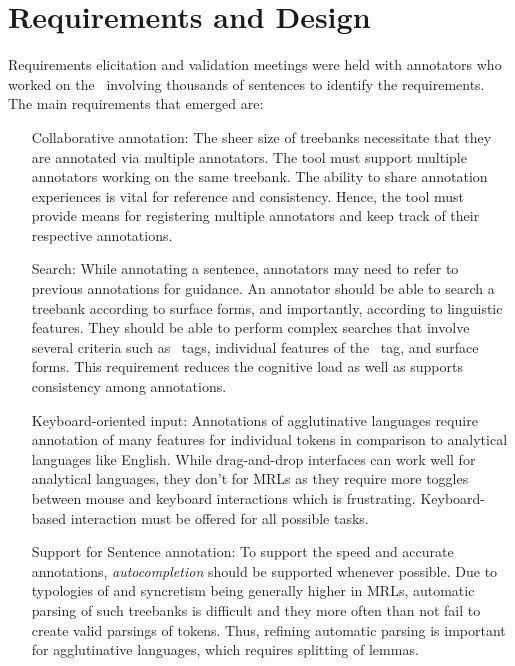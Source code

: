 \section{Requirements and Design}
\label{sec:requirements}


Requirements elicitation and validation meetings were held with annotators who worked on the  \bountreebank\ involving thousands of sentences to identify the requirements.
The main requirements that emerged are:
\begin{itemize}[before=\normalfont, font=\itshape, align=left,noitemsep,topsep=0pt,parsep=0pt,partopsep=0pt,labelwidth=5cm,align=left,itemindent=5cm]
    \item[Collaborative annotation:]
        The sheer size of treebanks necessitate that they are annotated via multiple annotators.
        The tool must support multiple annotators working on the same treebank.
        The ability to share annotation experiences is vital for reference and consistency.
        Hence, the tool must provide means for registering multiple annotators and keep track of their respective annotations.
    \item[Search:]
        While annotating a sentence, annotators may need to refer to previous annotations for guidance.
        An annotator should be able to search a treebank according to surface forms, and importantly, according to linguistic features.
        They should be able to perform complex searches that involve several criteria such as \ud\ tags, individual features of the \feats\ tag, and surface forms.
        This requirement reduces the cognitive load as well as supports consistency among annotations.
    \item[Keyboard-oriented input:]
        Annotations of agglutinative languages require annotation of many features for individual tokens in comparison to analytical languages like English.
        While drag-and-drop interfaces can work well for analytical languages, they don't for MRLs as they require more toggles between mouse and keyboard interactions which is frustrating.
        Keyboard-based interaction must be offered for all possible tasks.
    \item[Support for Sentence annotation:]
        To support the speed and accurate annotations, \textit{autocompletion} should be supported whenever possible.
        Due to typologies of and syncretism being generally higher in MRLs, automatic parsing of such treebanks is difficult and they more often than not fail to create valid parsings of tokens.
        Thus, refining automatic parsing is important for agglutinative languages, which requires splitting of lemmas.

\end{itemize}
